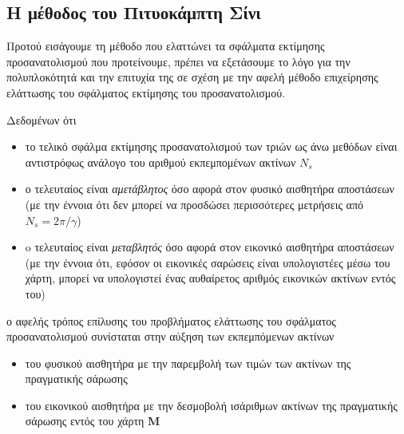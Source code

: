 \subsection{Η μέθοδος του Πιτυοκάμπτη Σίνι}
\label{subsection:02_04_02:05}

Προτού εισάγουμε τη μέθοδο που ελαττώνει τα σφάλματα εκτίμησης προσανατολισμού
που προτείνουμε, πρέπει να εξετάσουμε το λόγο για την πολυπλοκότητά και την
επιτυχία της σε σχέση με την αφελή μέθοδο επιχείρησης ελάττωσης του σφάλματος
εκτίμησης του προσανατολισμού.

Δεδομένων ότι

\begin{itemize}
  \item το τελικό σφάλμα εκτίμησης προσανατολισμού των τριών ως άνω
        μεθόδων είναι αντιστρόφως ανάλογο του αριθμού εκπεμπομένων ακτίνων $N_s$
  \item ο τελευταίος είναι \textit{αμετάβλητος} όσο αφορά στον φυσικό αισθητήρα
        αποστάσεων (με την έννοια ότι δεν μπορεί να προσδώσει περισσότερες
        μετρήσεις από $N_s = 2\pi/\gamma$)
  \item o τελευταίος είναι \textit{μεταβλητός} όσο αφορά στον εικονικό αισθητήρα
        αποστάσεων (με την έννοια ότι, εφόσον οι εικονικές σαρώσεις είναι
        υπολογιστέες μέσω του χάρτη, μπορεί να υπολογιστεί ένας αυθαίρετος
        αριθμός εικονικών ακτίνων εντός του)
\end{itemize}
ο αφελής τρόπος επίλυσης του προβλήματος ελάττωσης του σφάλματος
προσανατολισμού συνίσταται στην αύξηση των εκπεμπόμενων ακτίνων
\begin{itemize}
  \item του φυσικού αισθητήρα με την παρεμβολή των τιμών των ακτίνων της
        πραγματικής σάρωσης
  \item του εικονικού αισθητήρα με την δεσμοβολή ισάριθμων ακτίνων της
        πραγματικής σάρωσης εντός του χάρτη $\bm{M}$
\end{itemize}

